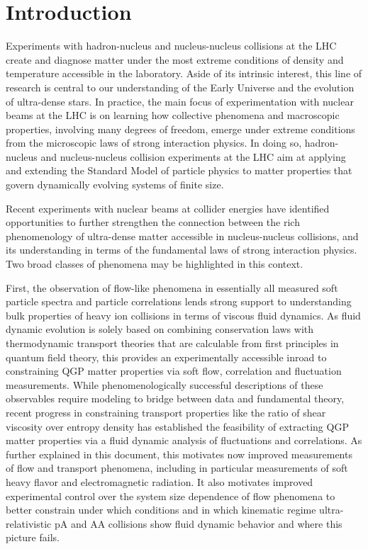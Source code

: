 \documentclass[../report.tex]{subfiles}
\begin{document}
\section{Introduction}

Experiments with hadron-nucleus and nucleus-nucleus collisions at the LHC create and diagnose matter under the most extreme conditions of density and temperature accessible in the laboratory. Aside of its intrinsic interest, this line of research is central to our understanding of the Early Universe and the evolution of ultra-dense stars. In practice, the main focus of experimentation with nuclear beams at the LHC is on learning how collective phenomena and macroscopic properties, involving many degrees of freedom, emerge under extreme conditions from the microscopic laws of strong interaction physics. In doing so, hadron-nucleus and nucleus-nucleus collision experiments at the LHC aim at applying and extending the Standard Model of particle physics to matter properties that govern dynamically evolving systems of finite size.

Recent experiments with nuclear beams at collider energies have identified opportunities to further strengthen the connection between the rich phenomenology of ultra-dense matter accessible in nucleus-nucleus collisions, and its understanding in terms of the fundamental laws of strong interaction physics. Two broad classes of phenomena may be highlighted in this context.

First, the observation of flow-like phenomena in essentially all measured soft particle spectra and particle correlations lends strong support to understanding bulk properties of heavy ion collisions in terms of viscous fluid dynamics. As fluid dynamic evolution is solely based on combining conservation laws with thermodynamic transport theories that are calculable from first principles in quantum field theory, this provides an experimentally accessible inroad to constraining QGP matter properties via soft flow, correlation and fluctuation measurements. While phenomenologically successful descriptions of these observables require modeling to bridge between data and fundamental theory, recent progress in constraining transport properties like the ratio of shear viscosity over entropy density has established the feasibility of extracting QGP matter properties via a fluid dynamic analysis of fluctuations and correlations. As further explained in this document, this motivates now improved measurements of flow and transport phenomena, including in particular measurements of soft heavy flavor and electromagnetic radiation.  It also motivates improved experimental control over the system size dependence of flow phenomena to better constrain under which conditions and in which kinematic regime ultra-relativistic pA and AA collisions show fluid dynamic behavior and where this picture fails.
\end{document}

